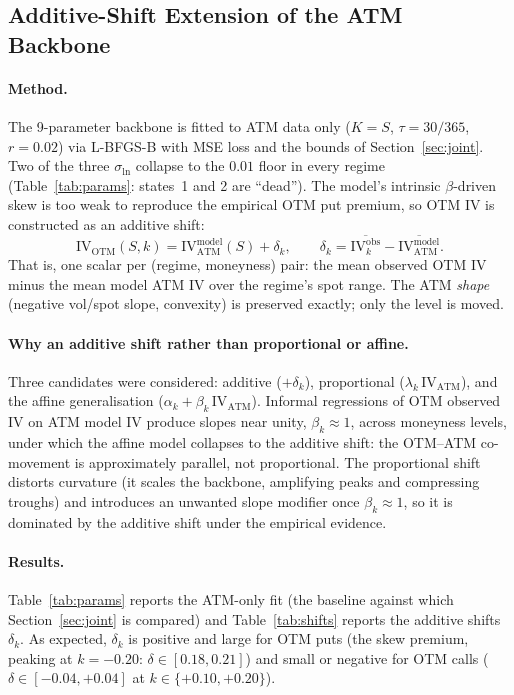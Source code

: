 \documentclass[12pt]{article}
\begin{document}
\subsection{Additive-Shift Extension of the ATM Backbone}
\label{sec:robust_additive}

\paragraph{Method.} The 9-parameter backbone is fitted to ATM data only ($K=S$, $\tau=30/365$, $r=0.02$) via L-BFGS-B with MSE loss and the bounds of Section~\ref{sec:joint}. Two of the three $\sigma_{\ln}$ collapse to the $0.01$ floor in every regime (Table~\ref{tab:params}: states~1 and 2 are ``dead''). The model's intrinsic $\beta$-driven skew is too weak to reproduce the empirical OTM put premium, so OTM IV is constructed as an additive shift:
\begin{equation}
  \text{IV}_{\text{OTM}}(S,k) = \text{IV}_{\text{ATM}}^{\text{model}}(S) + \delta_k,
  \qquad
  \delta_k = \overline{\text{IV}_k^{\text{obs}}} - \overline{\text{IV}_{\text{ATM}}^{\text{model}}}.
\end{equation}
That is, one scalar per (regime, moneyness) pair: the mean observed OTM IV minus the mean model ATM IV over the regime's spot range. The ATM \emph{shape} (negative vol/spot slope, convexity) is preserved exactly; only the level is moved.

\paragraph{Why an additive shift rather than proportional or affine.} Three candidates were considered: additive ($+\delta_k$), proportional ($\lambda_k\,\text{IV}_{\text{ATM}}$), and the affine generalisation ($\alpha_k+\beta_k\,\text{IV}_{\text{ATM}}$). Informal regressions of OTM observed IV on ATM model IV produce slopes near unity, $\beta_k \approx 1$, across moneyness levels, under which the affine model collapses to the additive shift: the OTM--ATM co-movement is approximately parallel, not proportional. The proportional shift distorts curvature (it scales the backbone, amplifying peaks and compressing troughs) and introduces an unwanted slope modifier once $\beta_k \approx 1$, so it is dominated by the additive shift under the empirical evidence.

\paragraph{Results.} Table~\ref{tab:params} reports the ATM-only fit (the baseline against which Section~\ref{sec:joint} is compared) and Table~\ref{tab:shifts} reports the additive shifts $\delta_k$. As expected, $\delta_k$ is positive and large for OTM puts (the skew premium, peaking at $k=-0.20$: $\delta \in [0.18, 0.21]$) and small or negative for OTM calls ($\delta \in [-0.04, +0.04]$ at $k \in \{+0.10,+0.20\}$).
\end{document}
